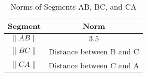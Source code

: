 
\begin{table}[h!]
\centering
\begin{tabular}{|c|c|}
\hline
\textbf{Segment} & \textbf{Norm} \\ \hline
\( \| AB \| \) & $3.5$ \\ \hline
\( \| BC \| \) & Distance between B and C \\ \hline
\( \| CA \| \) & Distance between C and A \\ \hline
\end{tabular}
\caption{Norms of Segments AB, BC, and CA}
\end{table}
